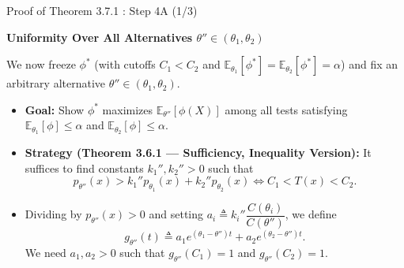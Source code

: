 \documentclass[10pt, aspectratio=169, xcolor=dvipsnames]{beamer}
\newcommand{\lead}[1]{{\color{UniBlue}\bfseries #1}}
\begin{document}
\begin{frame}{Proof of Theorem 3.7.1 : Step 4A (1/3)}
    
    \lead{Uniformity Over All Alternatives $\theta'' \in (\theta_1, \theta_2)$}\\
    \vspace{0.2cm}
    
    \color{Slate}
    We now freeze $\phi^*$ (with cutoffs $C_1 < C_2$ and $\mathbb{E}_{\theta_1}[\phi^*] = \mathbb{E}_{\theta_2}[\phi^*] = \alpha$) and fix an arbitrary alternative $\theta'' \in (\theta_1, \theta_2)$.
    
    \vspace{0.15cm}
    \begin{itemize}
        \setlength\itemsep{6pt}
        \item[\textcolor{Teal}{\textbullet}] \textbf{Goal:} Show $\phi^*$ maximizes $\mathbb{E}_{\theta''}[\phi(X)]$ among all tests satisfying $\mathbb{E}_{\theta_1}[\phi] \le \alpha$ and $\mathbb{E}_{\theta_2}[\phi] \le \alpha$.
        
        \item[\textcolor{Teal}{\textbullet}] \textbf{Strategy (Theorem 3.6.1 — Sufficiency, Inequality Version):} It suffices to find constants $k_1'', k_2'' > 0$ such that
        \[p_{\theta''}(x) > k_1'' p_{\theta_1}(x) + k_2'' p_{\theta_2}(x) \iff C_1 < T(x) < C_2.\]
        
        \item[\textcolor{Teal}{\textbullet}] Dividing by $p_{\theta''}(x) > 0$ and setting $a_i \triangleq k_i'' \dfrac{C(\theta_i)}{C(\theta'')}$, we define
        \[g_{\theta''}(t) \triangleq a_1 e^{(\theta_1 - \theta'') t} + a_2 e^{(\theta_2 - \theta'') t}.\]
        We need $a_1, a_2 > 0$ such that $g_{\theta''}(C_1) = 1$ and $g_{\theta''}(C_2) = 1$.
    \end{itemize}
\end{frame}
\end{document}
